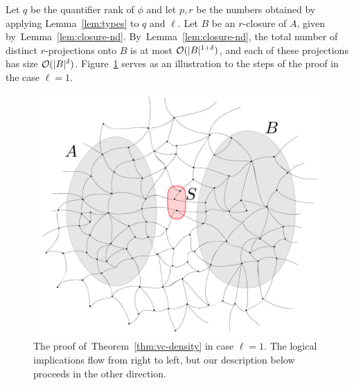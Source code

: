 	Let $q$ be the quantifier rank of $\phi$ and let 
$p,r$ be the numbers obtained by applying Lemma~\ref{lem:types} to $q$ and $\ell$.
Let $B$ be an $r$-closure of $A$, given by~Lemma~\ref{lem:closure-nd}.
  By~Lemma~\ref{lem:closure-nd}, the total number of distinct $r$-projections onto $B$ 
  is at most $\mathcal{O}(|B|^{1+\delta})$, and each of these projections has size $\mathcal{O}(|B|^{\delta})$.
  	   Figure~\ref{fig:sketch} serves as  an illustration to the steps of the proof in the case $\ell=1$.
  	   \begin{figure}[h!]
  	   	\centering
  	   		\includegraphics[width=\textwidth,scale=0.346,page=4]{pics}
%
%
  			\caption{The proof of~Theorem~\ref{thm:vc-density} in case $\ell=1$. 
  The logical implications flow from right to left,
  but our description below proceeds in the other direction.
  			}
  	   	\label{fig:sketch}
  	   \end{figure}
	
